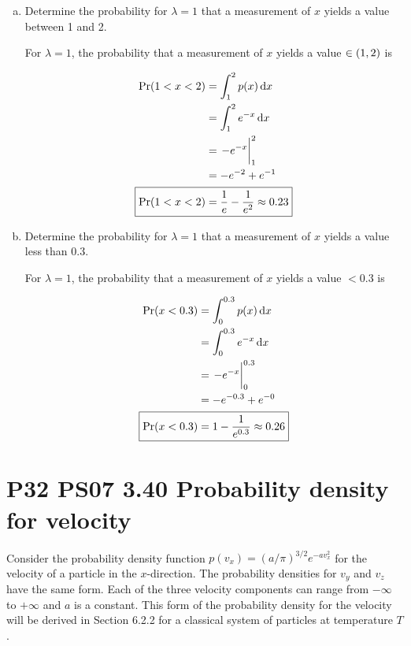 \documentclass[9pt,a4paper,twocolumn]{article}
\begin{document}
\begin{enumerate}[(a)]
\item Determine the probability for $\lambda = 1$ that a measurement of $x$ yields a value between 1 and 2.

For $\lambda = 1$, the probability that a measurement of $x$ yields a value $\in \qty(1,2)$ is

\begin{align}
	\Pr(1 < x < 2) &= \int_1^2 p(x) \dd{x} \\
	&= \int_1^2 e^{-x} \dd{x} \nonumber \\
	&= \eval{-e^{-x}}_1^2 \nonumber \\
	&= -e^{-2} + e^{-1} \nonumber \\
	\Aboxed{
		\Pr(1<x<2) &= \frac{1}{e} - \frac{1}{e^2} \approx 0.23
	} \label{eq:answer-d}
\end{align}

\item Determine the probability for $\lambda = 1$ that a measurement of $x$ yields a value less than 0.3.

For $\lambda = 1$, the probability that a measurement of $x$ yields a value $< 0.3$ is

\begin{align}
	\Pr(x<0.3) &= \int_0^{0.3} p(x) \dd{x} \\
	&= \int_0^{0.3} e^{-x} \dd{x} \nonumber \\
	&= \eval{-e^{-x}}_0^{0.3} \nonumber \\
	&= -e^{-0.3} + e^{-0} \nonumber \\
	\Aboxed{
		\Pr(x<0.3) &= 1 - \frac{1}{e^{0.3}} \approx 0.26
	} \label{eq:answer-e}
\end{align}

\end{enumerate}

\section{P32 PS07 3.40 Probability density for velocity}
Consider the probability density function $p(v_x) = (a/\pi)^{3/2} e^{-av_x^2}$ for the velocity of a particle in the $x$-direction. The probability densities for $v_y$ and $v_z$ have the same form. Each of the three velocity components can range from $-\infty$ to $+\infty$ and $a$ is a constant. This form of the probability density for the velocity will be derived in Section 6.2.2 for a classical system of particles at temperature $T$.
\end{document}
